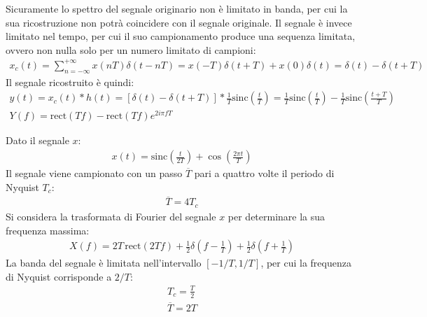\documentclass{article}
\newcommand{\rect}{\mathrm{rect}}
\newcommand{\sinc}{\mathrm{sinc}}
\begin{document}
Sicuramente lo spettro del segnale originario non è limitato in banda, per cui la sua ricostruzione non potrà coincidere con il segnale originale. Il segnale è invece limitato 
nel tempo, per cui il suo campionamento produce una sequenza limitata, ovvero non nulla solo per un numero limitato di campioni:
\begin{gather*}
    x_c(t)=\displaystyle\sum_{n=-\infty}^{+\infty}x(nT)\delta(t-nT)=x(-T)\delta(t+T)+x(0)\delta(t)=\delta(t)-\delta(t+T)
\end{gather*}
Il segnale ricostruito è quindi:
\begin{gather}
    y(t)=x_c(t)*h(t)=\left[\delta(t)-\delta(t+T)\right]*\frac{1}{T}\sinc\left(\frac{t}{T}\right)=\frac{1}{T}\sinc\left(\frac{t}{T}\right)-\frac{1}{T}\sinc\left(\frac{t+T}{T}\right)\\
    Y(f)=\rect(Tf)-\rect(Tf)e^{2i\pi fT}
\end{gather}


Dato il segnale $x$:
\begin{gather*}
    x(t)=\sinc\left(\displaystyle\frac{t}{2T}\right)+\cos\left(\frac{2\pi t}{T}\right)
\end{gather*}
Il segnale viene campionato con un passo $\overline{T}$ pari a quattro volte il periodo di Nyquist $T_c$:
\begin{gather*}
    \overline{T}=4T_c
\end{gather*}
Si considera la trasformata di Fourier del segnale $x$ per determinare la sua frequenza massima:
\begin{gather*}
    X(f)=2T\,\rect(2Tf)+\displaystyle\frac{1}{2}\delta\left(f-\frac{1}{T}\right)+\frac{1}{2}\delta\left(f+\frac{1}{T}\right)
\end{gather*}
La banda del segnale è limitata nell'intervallo $[-1/T, 1/T]$, per cui la frequenza di Nyquist corrisponde a $2/T$:
\begin{gather*}
    T_c=\displaystyle\frac{T}{2}\\
    \overline{T}=2T
\end{gather*}
\end{document}
